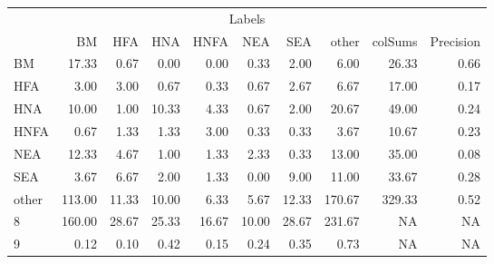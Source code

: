 \begin{table}
\centering\begingroup\fontsize{11}{13}\selectfont

\begin{tabular}{lrrrrrr>{}r|rr}
\toprule
\multicolumn{10}{c}{Labels} \\
\cmidrule(l{3pt}r{3pt}){1-10}
  & BM & HFA & HNA & HNFA & NEA & SEA & other & colSums & Precision\\
\midrule
BM & 17.33 & 0.67 & 0.00 & 0.00 & 0.33 & 2.00 & 6.00 & 26.33 & 0.66\\
HFA & 3.00 & 3.00 & 0.67 & 0.33 & 0.67 & 2.67 & 6.67 & 17.00 & 0.17\\
HNA & 10.00 & 1.00 & 10.33 & 4.33 & 0.67 & 2.00 & 20.67 & 49.00 & 0.24\\
HNFA & 0.67 & 1.33 & 1.33 & 3.00 & 0.33 & 0.33 & 3.67 & 10.67 & 0.23\\
NEA & 12.33 & 4.67 & 1.00 & 1.33 & 2.33 & 0.33 & 13.00 & 35.00 & 0.08\\
\addlinespace
SEA & 3.67 & 6.67 & 2.00 & 1.33 & 0.00 & 9.00 & 11.00 & 33.67 & 0.28\\
other & 113.00 & 11.33 & 10.00 & 6.33 & 5.67 & 12.33 & 170.67 & 329.33 & 0.52\\
8 & 160.00 & 28.67 & 25.33 & 16.67 & 10.00 & 28.67 & 231.67 & NA & NA\\
9 & 0.12 & 0.10 & 0.42 & 0.15 & 0.24 & 0.35 & 0.73 & NA & NA\\
\bottomrule
\end{tabular}
\endgroup{}
\end{table}
